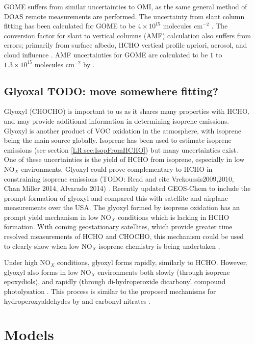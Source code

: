       GOME suffers from similar uncertainties to OMI, as the same general method of DOAS remote measurements are performed.
      The uncertainty from slant column fitting has been calculated for GOME to be $4\times10^{15}$ molecules cm$^{-2}$ \citep{Chance2000, Millet2006}. 
      The conversion factor for slant to vertical columns (AMF) calculation also suffers from errors; primarily from surface albedo, HCHO vertical profile apriori, aerosol, and cloud influence \citep{Millet2006}. 
      AMF uncertainties for GOME are calculated to be $1$ to $1.3\times10^{15}$ molecules cm$^{-2}$ by \citet{Shim2005}.
    
  \subsection{Glyoxal TODO: move somewhere fitting?}
    Glyoxyl (CHOCHO) is important to us as it shares many properties with HCHO, and may provide additional information in determining isoprene emissions.
    Glyoxyl is another product of VOC oxidation in the atmosphere, with isoprene being the main source globally.
    Isoprene has been used to estimate isoprene emissions (see section \ref{LR:sec:IsopFromHCHO}) but many uncertainties exist.
    One of these uncertainties is the yield of HCHO from isoprene, especially in low NO$_X$ environments.
    Glyoxyl could prove complementary to HCHO in constraining isoprene emissions (TODO: Read and cite Vrekoussis2009,2010, Chan Miller 2014, Alvarado 2014) \citep{Miller2017}.
    Recently \cite{Miller2017} updated GEOS-Chem to include the prompt formation of glyoxyl and compared this with satellite and airplane measurements over the USA.
    The glyoxyl formed by isoprene oxidation has an prompt yield mechanism in low NO$_X$ conditions which is lacking in HCHO formation.
    With coming geostationary satellites, which provide greater time resolved measurements of HCHO and CHOCHO, this mechanism could be used to clearly show when low NO$_X$ isoprene chemistry is being undertaken \citep{Miller2017}.
    
    Under high NO$_X$ conditions, glyoxyl forms rapidly, similarly to HCHO.
    However, glyoxyl also forms in low NO$_X$ environments both slowly (through isoprene epoxydiols), and rapidly (through di-hydroperoxide dicarbonyl compound photolysation \citep{Crounse2013}.
    This process is similar to the proposed mechanisms for hydroperoxyaldehydes by \citet{Peeters2014} and carbonyl nitrates \citep{Muller2014}.
    
\section{Models}
  \label{LR:Models}
